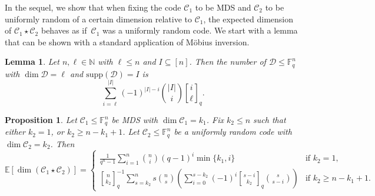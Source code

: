 \documentclass[a4paper,11pt,reqno]{article}
\newcommand{\F}{\mathbb{F}}
\newcommand{\supp}{\mathrm{supp}}
\newcommand{\C}{\mathcal{C}}
\newcommand{\D}{\mathcal{D}}
\newcommand{\qbinom}[2]{\genfrac[]{0pt}{0}{#1}{#2}}
\theoremstyle{plain} \numberwithin{equation}{section}
\newtheorem{Lemma}[theorem]{Lemma}
\newtheorem{proposition}[theorem]{Proposition}
\theoremstyle{definition}
\begin{document}
In the sequel, we show that when fixing the code $\C_1$ to be MDS and $\C_2$ to be uniformly random of a certain dimension relative to $\C_1$, the expected dimension of $\C_1 \star \C_2$ behaves as if~$\C_1$ was a uniformly random code. We start with a lemma that can be shown with a standard application of Möbius inversion.

\begin{Lemma} \label{lem:supp_subspaces}
Let $n,\ell\in \mathbb{N}$ with $\ell \leq n$ and $I\subseteq [n]$. Then the number of $\D \leq \F_q^n$ with $\dim \D = \ell$ and $\supp(\D) = I$ is 
\[\sum^{|I|}_{i=\ell}(-1)^{|I|-i} \binom{|I|}{i}\qbinom{i}{\ell}_q.\]
\end{Lemma}

\begin{proposition}\label{prop:expdim-mds-rnd}
Let $\C_1\leq \mathbb{F}_q^n$ be MDS with $\dim \C_1 = k_1$. Fix $k_2\leq n$ such that either $k_2=1$, or $k_2\geq n-k_1+1$. Let $\C_2 \leq \mathbb{F}_q^n$ be a uniformly random code with $\dim \C_2 = k_2$. Then$$ \mathbb{E}[\dim (\C_1\star\C_2)] =
\begin{cases}
    \frac{1}{q^n-1} \sum^n_{i=1}\binom{n}{i}(q-1)^{i}\min\{k_1,i\}&\text{if } k_2 = 1,\\
      \qbinom{n}{k_2}^{-1}_q \sum_{s=k_2}^n s\binom{n}{s}\left( \sum_{i=0}^{s-k_2} (-1)^i \qbinom{s-i}{k_2}_q\binom{s}{s - i}\right)&\text{if } k_2 \geq n-k_1+1.
\end{cases}$$
\end{proposition}
\end{document}
